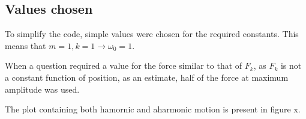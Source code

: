 \documentclass[a4paper]{article}
\begin{document}
\subsection*{Values chosen}
To simplify the code, simple values were chosen for the required constants. This means that $m = 1, k=1 \rightarrow \omega_{0}=1$.

When a question required a value for the force similar to that of $F_{k}$, as $F_{k}$ is not a constant function of position, as an estimate, half of the force at maximum amplitude was used. 

The plot containing both hamornic and aharmonic motion is present in figure x.
\end{document}
